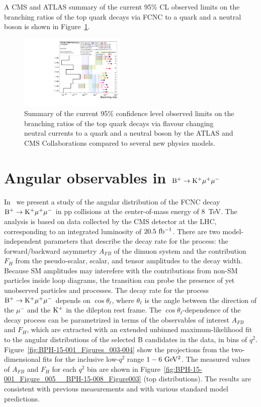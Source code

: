 \documentclass{PoS}
\begin{document}
A CMS and ATLAS summary of the current 95\% CL observed limits on the branching
ratios of the top quark decays via FCNC to a quark and a neutral boson is shown
in Figure~\ref{fig:fcnc_summarybsm_may18}.

\begin{figure}[htb]
\centering
\includegraphics[width=0.45\textwidth]{figures/fcnc_summarybsm_may18}
\caption{
  Summary of the current 95\% confidence level observed limits on the branching
  ratios of the top quark decays via flavour changing neutral currents to a
  quark and a neutral boson by the ATLAS and CMS Collaborations compared to
  several new physics models. 
}
\label{fig:fcnc_summarybsm_may18}
\end{figure}


\section{Angular observables in ${\rm B^+ \to K^+\mu^+\mu^-}$}

In~\cite{bph-15-001} we present a study of the angular distribution of the FCNC
decay ${\rm B^+ \to K^+\mu^+\mu^-}$ in pp collisions at the center-of-mass
energy of 8~TeV. The analysis is based on data collected by the CMS detector at
the LHC, corresponding to an integrated luminosity of ${\rm 20.5~fb^{-1}}$.
There are two model-independent parameters that describe the decay rate for the
process: the forward/backward asymmetry $A_{FB}$ of the dimuon system and the
contribution $F_H$ from the pseudo-scalar, scalar, and tensor amplitudes to the
decay width. Because SM amplitudes may interefere with the contributions from
non-SM particles inside loop diagrams, the transition can probe the presence of
yet unobserved particles and processes.
The decay rate for the process ${\rm B^+ \to K^+\mu^+\mu^-}$ depends on
$\cos\theta_{\ell}$, where $\theta_{\ell}$ is the angle between the direction
of the $\mu^-$ and the ${\rm K^+}$ in the dilepton rest frame. The
$\cos\theta_{\ell}$-dependence of the decay process can be parametrized in
terms of the observables of interest $A_{FB}$ and $F_H$, which are extracted
with an extended unbinned maximum-likelihood fit to the angular distributions
of the selected B candidates in the data, in bins of $q^2$.
Figure~\ref{fig:BPH-15-001_Figures_003-004} show the projections from the
two-dimensional fits for the inclusive low-$q^2$ range ${\rm 1-6~GeV^2}$.
The measured values of $A_{FB}$ and $F_H$ for each $q^2$ bin are shown in
Figure~\ref{fig:BPH-15-001_Figure_005__BPH-15-008_Figure003}
(top distributions). The results are consistent with previous measurements and
with various standard model predictions.
\end{document}
